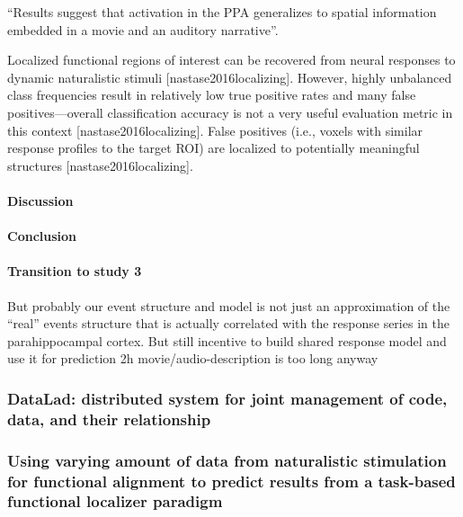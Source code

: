 ``Results suggest that activation in the PPA generalizes to spatial information
embedded in a movie and an auditory narrative''.




%
Localized functional regions of interest can be recovered from neural responses
to dynamic naturalistic stimuli [nastase2016localizing].
%
However, highly unbalanced class frequencies result in relatively low true
positive rates and many false positives—overall classification accuracy is not a
very useful evaluation metric in this context [nastase2016localizing].
%
False positives (i.e., voxels with similar response profiles to the target ROI)
are localized to potentially meaningful structures
[nastase2016localizing].


\paragraph{Discussion}



\paragraph{Conclusion}


\paragraph{Transition to study 3}

%
But probably our event structure and model is not just an approximation of the
``real'' events structure that is actually correlated with the response series
in the parahippocampal cortex.
%
But still incentive to build shared response model and use it for prediction
%
2h movie/audio-description is too long anyway


\subsubsection{DataLad: distributed system for joint management of code, data,
and their relationship}



\subsubsection{Using varying amount of data from naturalistic stimulation for
functional alignment to predict results from a task-based functional localizer
paradigm}

